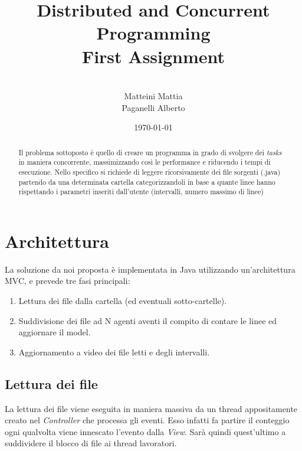 \documentclass{article}
\title{\textbf{Distributed and Concurrent Programming}\\ First Assignment}
\author{
\\Matteini Mattia
\\Paganelli Alberto
}
\date{\today}
\begin{document}
\maketitle

\begin{abstract}
Il problema sottoposto è quello di creare un programma in grado di svolgere dei \textit{tasks} in maniera concorrente, massimizzando così le performance e riducendo i tempi di esecuzione.
Nello specifico si richiede di leggere ricorsivamente dei file sorgenti (.java) partendo da una determinata cartella categorizzandoli in base a quante linee hanno rispettando i parametri inseriti dall'utente (intervalli, numero massimo di linee)

\end{abstract}


\section{Architettura}
La soluzione da noi proposta è implementata in Java utilizzando un'architettura MVC, e prevede tre fasi principali:
\begin{enumerate}
    \item Lettura dei file dalla cartella (ed eventuali sotto-cartelle).
    \item Suddivisione dei file ad N agenti aventi il compito di contare le linee ed aggiornare il model.
    \item Aggiornamento a video dei file letti e degli intervalli.
\end{enumerate}

\subsection{Lettura dei file}
La lettura dei file viene eseguita in maniera massiva da un thread appositamente creato nel \textit{Controller} che processa gli eventi. Esso infatti fa partire il conteggio ogni qualvolta viene innescato l'evento dalla \textit{View}.
Sarà quindi quest'ultimo a suddividere il blocco di file ai thread lavoratori.
\end{document}
